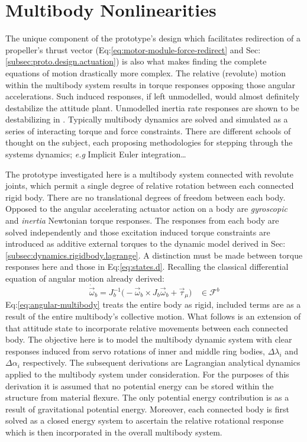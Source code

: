 \section{Multibody Nonlinearities}
\label{sec:dynamics.nonlinearities}
The unique component of the prototype's design which facilitates redirection of a propeller's thrust vector (Eq:\ref{eq:motor-module-force-redirect} and Sec:\ref{subsec:proto.design.actuation}) is also what makes finding the complete equations of motion drastically more complex. The relative (revolute) motion within the multibody system results in torque responses opposing those angular accelerations. Such induced responses, if left unmodelled, would almost definitely destabilize the attitude plant. Unmodelled inertia rate responses are shown to be destabilizing in \cite{inertiaspin}. Typically multibody dynamics are solved and simulated as a series of interacting torque and force constraints. There are different schools of thought on the subject, each proposing methodologies for stepping through the systems dynamics; \emph{e.g} Implicit Euler integration\cite{physicallybased,multibodydynamics}\ldots
\par
The prototype investigated here is a multibody system connected with revolute joints, which permit a single degree of relative rotation between each connected rigid body. There are no translational degrees of freedom between each body. Opposed to the angular accelerating actuator action on a body are \emph{gyroscopic} and \emph{inertia} Newtonian torque responses. The responses from each body are solved independently and those excitation induced torque constraints are introduced as additive external torques to the dynamic model derived in Sec:\ref{subsec:dynamics.rigidbody.lagrange}. A distinction must be made between torque responses here and those in Eq:\ref{eq:states.d}. Recalling the classical differential equation of angular motion already derived:
\begin{equation}\label{eq:angular-multibody}
\dot{\vec{\omega}}_b=J_b^{-1}\big(-\vec{\omega}_b\times J_b\vec{\omega}_b+\vec{\tau}_\mu\big)~~~~\in\mathcal{F}^b
\end{equation}
Eq:\ref{eq:angular-multibody} treats the entire body as rigid, included terms are as a result of the entire multibody's collective motion. What follows is an extension of that attitude state to incorporate relative movements between each connected body. The objective here is to model the multibody dynamic system with clear responses induced from servo rotations of inner and middle ring bodies, $\Delta\lambda_i$ and $\Delta\alpha_i$ respectively. The subsequent derivations are Lagrangian analytical dynamics applied to the multibody system under consideration. For the purposes of this derivation it is assumed that no potential energy can be stored within the structure from material flexure. The only potential energy contribution is as a result of gravitational potential energy. Moreover, each connected body is first solved as a closed energy system to ascertain the relative rotational response which is then incorporated in the overall multibody system.
